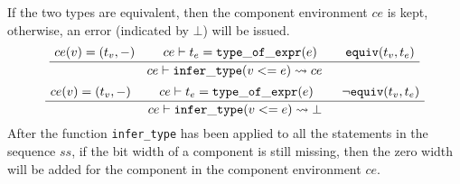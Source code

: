 {If the two types are equivalent, then the component environment $ce$ is kept, otherwise, an error (indicated by $\bot$) will be issued.
\begin{gather*}
    \inferiii[]
    {\seqq{ce \vdash {\tt infer\_type} (v<=e) \rightsquigarrow ce}}
    {\seqq{ce(v) = (t_v,-)}}
    {\seqq{ce \vdash t_e={\tt type\_of\_expr}(e)}} {\seqq{{\tt equiv}(t_v,t_e)}}
    \end{gather*}
\begin{gather*}
    \inferiii[]
    {\seqq{ce \vdash {\tt infer\_type} (v<=e) \rightsquigarrow \bot}}
    {\seqq{ce(v) = (t_v, -)}}
    {\seqq{ce \vdash t_e={\tt type\_of\_expr}(e)}} {\seqq{\neg{\tt equiv}(t_v,t_e)}}
    \end{gather*}
After the function {\tt infer\_type} has been applied to all the statements in the sequence $ss$, if the bit width of a component is still missing, then the zero width will be added for the component in
the component environment $ce$.
}







